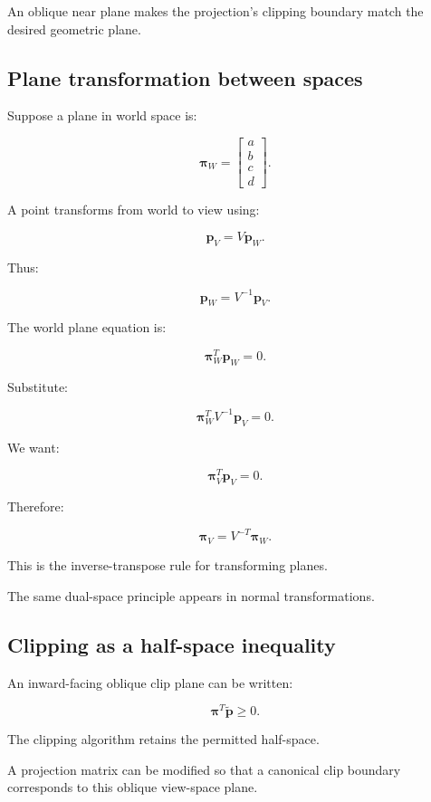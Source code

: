 An oblique near plane makes the projection's clipping boundary match the desired geometric plane.

\subsection{Plane transformation between spaces}\label{02-foundations-ii-ch034-plane-transformation-between-spaces}

Suppose a plane in world space is:

\[
 \boldsymbol\pi_W= \begin{bmatrix} a\\b\\c\\d \end{bmatrix}.
\]

A point transforms from world to view using:

\[
 \mathbf p_V=V\mathbf p_W.
\]

Thus:

\[
 \mathbf p_W=V^{-1}\mathbf p_V.
\]

The world plane equation is:

\[
 \boldsymbol\pi_W^T\mathbf p_W=0.
\]

Substitute:

\[
 \boldsymbol\pi_W^TV^{-1}\mathbf p_V=0.
\]

We want:

\[
 \boldsymbol\pi_V^T\mathbf p_V=0.
\]

Therefore:

\[
 \boxed{ \boldsymbol\pi_V=V^{-T}\boldsymbol\pi_W }.
\]

This is the inverse-transpose rule for transforming planes.

The same dual-space principle appears in normal transformations.

\subsection{Clipping as a half-space inequality}\label{02-foundations-ii-ch034-clipping-as-a-half-space-inequality}

An inward-facing oblique clip plane can be written:

\[
 \boxed{ \boldsymbol\pi^T\tilde{\mathbf p}\ge0 }.
\]

The clipping algorithm retains the permitted half-space.

A projection matrix can be modified so that a canonical clip boundary corresponds to this oblique view-space plane.

